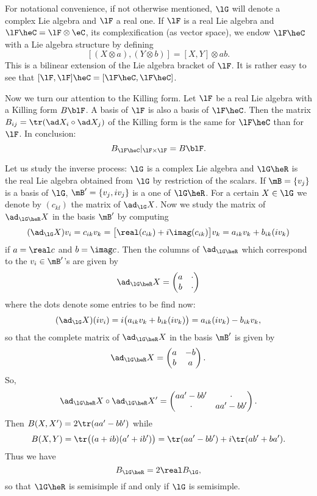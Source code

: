 For notational convenience, if not otherwise mentioned, $\lG$ will denote a complex Lie algebra and $\lF$ a real one. If $\lF$ is a real Lie algebra and $\lF\heC=\lF\otimes\eC$, its complexification (as vector space), we endow $\lF\heC$ with a Lie algebra structure by defining
\[
  [ (X\otimes a),(Y\otimes b)  ]=[X,Y]\otimes ab.
\]
This is a bilinear extension of the Lie algebra bracket of $\lF$. It is rather easy to see that $[\lF,\lF]\heC=[\lF\heC,\lF\heC]$.

Now we turn our attention to the Killing form. Let $\lF$ be a real Lie algebra with a Killing form $B\blF$. A basis of $\lF$ is also a basis of $\lF\heC$. Then the matrix $B_{ij}=\tr( \ad X_i\circ\ad X_j )$ of the Killing form is the same for $\lF\heC$ than for $\lF$. In conclusion:
\[
   B_{\lF\heC}|_{\lF\times\lF}=B\blF.
\]

Let us study the inverse process: $\lG$ is a complex Lie algebra and $\lG\heR$ is the real Lie algebra obtained from $\lG$ by restriction of the scalars. If $\mB=\{v_j\}$ is a basis of $\lG$, $\mB'=\{v_j,iv_j\}$ is a one of $\lG\heR$. For a certain $X\in\lG$ we denote by $(c_{kl})$ the matrix of $\ad_{\lG}X$. Now we study the matrix of $\ad_{\lG\heR}X$ in the basis $\mB'$ by computing
\begin{equation}
(\ad_{\lG}X)v_i=c_{ik}v_k
               =\big[ \real(c_{ik})+i\imag(c_{ik}) \big]v_k
           =a_{ik}v_k+b_{ik}(iv_k)
\end{equation}
if $a=\real c$ and $b=\imag c$. Then the columns of $\ad_{\lG\heR}$ which correspond to the $v_i\in\mB'$'s are given by
\[
\ad_{\lG\heR}X=\begin{pmatrix}
                 a&\cdot\\
         b&\cdot
               \end{pmatrix}
\]
where the dots denote some entries to be find now:
\begin{equation}
(\ad_{\lG}X)(iv_i)=i\big(  a_{ik}v_k+b_{ik}(iv_k)  \big)\\
                  =a_{ik}(iv_k)-b_{ik}v_k,
\end{equation}
so that the complete matrix of $\ad_{\lG\heR}X$ in the basis $\mB'$ is given by
\[
\ad_{\lG\heR}X=\begin{pmatrix}
                 a&-b\\
         b&a
               \end{pmatrix}.
\]
So,
\[
\ad_{\lG\heR}X\circ\ad_{\lG\heR}X'=\begin{pmatrix}
                 aa'-bb'&\cdot\\
         \cdot&aa'-bb'
               \end{pmatrix}.
\]
Then $B(X,X')=2\tr(aa'-bb')$ while
\begin{equation}
  B(X,Y)=\tr\big(  (a+ib)(a'+ib')  \big)\\
        =\tr(aa'-bb')+i\tr(ab'+ba').
\end{equation}
Thus we have
\begin{equation}
     B_{\lG\heR}=2\real B_{\lG},
\end{equation}
so that $\lG\heR$ is semisimple if and only if $\lG$ is semisimple.

